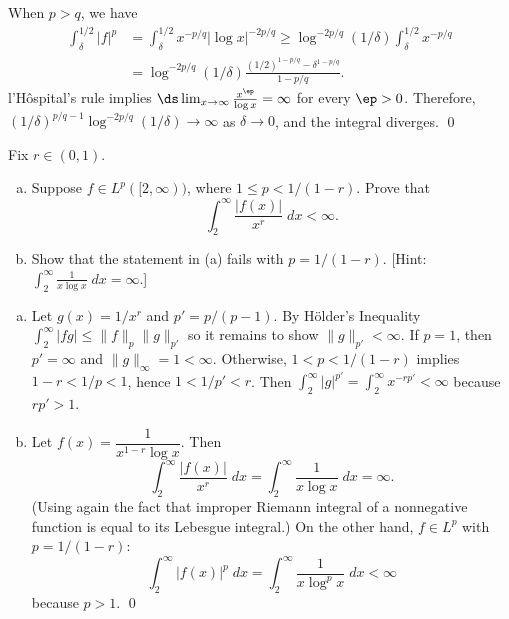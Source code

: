 \begin{hwsol}
\begin{enumerate}[(a)]
When $p > q$, we have 
        \[
        \begin{split}
        \int_\delta^{1/2} |f|^p&= \int_\delta^{1/2} x^{-p/q}|\log x|^{-2p/q}  \geq \log^{-2p/q}(1/\delta) \int_\delta^{1/2} x^{-p/q} \\ 
        &= \log^{-2p/q} (1/\delta) \frac{(1/2)^{1-p/q}-\delta^{1-p/q}}{1-p/q}.
        \end{split}
        \]
l'H\^ospital's rule implies $\ds\lim_{x \to \infty} \frac{x^\ep}{\log x}= \infty$ for every $\ep >0$. Therefore,  $(1/\delta)^{p/q - 1} \log^{-2p/q} (1/\delta) \to \infty$ as $\delta \to 0$, and the integral diverges. \qed \\
\end{enumerate}
\end{hwsol}


\begin{hwsol}
Fix $r \in (0, 1)$. 
	\begin{enumerate}[(a)]
	\item Suppose $f \in L^p([2, \infty))$, where $1\leq p<1/(1-r)$. Prove that 
		\[
		\int_2^\infty \dfrac{|f(x)|}{x^r} \;dx < \infty.
		\]
	\item Show that the statement in (a) fails with $p= 1/(1-r)$. [Hint: $\int_2^\infty \frac{1}{x\log x} \;dx= \infty$.] \\
	\end{enumerate} 

\pf \hfill
\begin{enumerate}[(a)]
\item Let $g(x)= 1/x^r$ and $p'= p/(p-1)$. By H\"older's Inequality $\int_2^\infty |fg| \leq \|f\|_p \|g\|_{p'}$ so it remains to show $\|g\|_{p'} < \infty$. If $p= 1$, then $p'= \infty$ and $\|g\|_\infty= 1 < \infty$. Otherwise, $1< p < 1/(1-r)$ implies $1-r < 1/p < 1$, hence $1 < 1/p' < r$. Then $\int_2^\infty |g|^{p'}= \int_2^\infty x^{-rp'} < \infty$ because $rp' > 1$. 

\item Let $f(x)= \dfrac{1}{x^{1-r}\log x}$. Then 
        \[
        \int_2^\infty \frac{|f(x)|}{x^r} \;dx= \int_2^\infty \frac{1}{x \log x} \;dx= \infty.
        \]
(Using again the fact that improper Riemann integral of a nonnegative function is equal to its Lebesgue integral.) On the other hand, $f\in L^{p}$ with $p=1/(1-r)$: 
        \[
        \int_2^\infty |f(x)|^{p} \;dx= \int_2^\infty \frac{1}{x \log^p x} \;dx < \infty
        \]
because $p > 1$. \qed \\
\end{enumerate}
 \end{hwsol}



